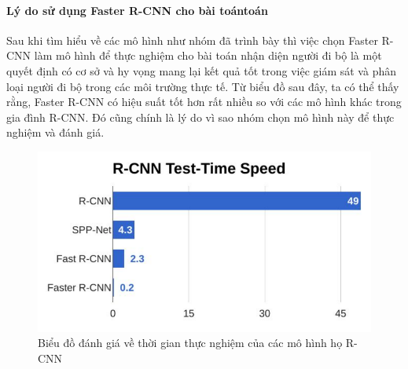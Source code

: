 \paragraph{Lý do sử dụng Faster R-CNN cho bài toántoán\\}

Sau khi tìm hiểu về các mô hình như nhóm đã trình bày thì việc chọn Faster R-CNN làm mô hình để thực nghiệm cho bài toán nhận diện người đi bộ là một quyết định có cơ sở và hy vọng mang lại kết quả tốt trong việc giám sát và phân loại người đi bộ trong các môi trường thực tế. Từ biểu đồ sau đây, ta có thể thấy rằng, Faster R-CNN có hiệu suất tốt hơn rất nhiều so với các mô hình khác trong gia đình R-CNN. Đó cũng chính là lý do vì sao nhóm chọn mô hình này để thực nghiệm và đánh giá. 

\begin{figure}[h!]
  \centering
  \includegraphics[scale=0.6]{graphics/whychoosefaster.png}
  \caption{Biểu đồ đánh giá về thời gian thực nghiệm của các mô hình họ R-CNN \cite{slide}}
\end{figure}

